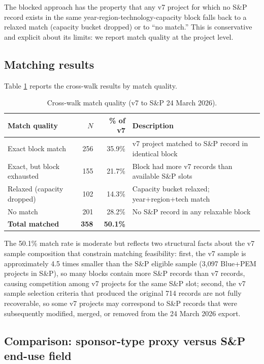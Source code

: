 \documentclass[11pt,a4paper]{article}
\begin{document}
The blocked approach has the property that any v7 project for which no S\&P record exists in the same year-region-technology-capacity block falls back to a relaxed match (capacity bucket dropped) or to ``no match.'' This is conservative and explicit about its limits: we report match quality at the project level.

\subsection{Matching results}

Table \ref{tab:app-matching-quality} reports the cross-walk results by match quality.

\begin{table}[ht]
\centering
\caption{Cross-walk match quality (v7 to S\&P 24 March 2026).}
\label{tab:app-matching-quality}
\begin{tabular}{lrrl}
\toprule
Match quality & $N$ & \% of v7 & Description \\
\midrule
Exact block match           & 256 & 35.9\% & v7 project matched to S\&P record in identical block \\
Exact, but block exhausted  & 155 & 21.7\% & Block had more v7 records than available S\&P slots \\
Relaxed (capacity dropped)  & 102 & 14.3\% & Capacity bucket relaxed; year+region+tech match \\
No match                    & 201 & 28.2\% & No S\&P record in any relaxable block \\
\midrule
\textbf{Total matched}      & \textbf{358} & \textbf{50.1\%} & \\
\bottomrule
\end{tabular}
\end{table}

The 50.1\% match rate is moderate but reflects two structural facts about the v7 sample composition that constrain matching feasibility: first, the v7 sample is approximately 4.5 times smaller than the S\&P eligible sample (3{,}097 Blue+PEM projects in S\&P), so many blocks contain more S\&P records than v7 records, causing competition among v7 projects for the same S\&P slot; second, the v7 sample selection criteria that produced the original 714 records are not fully recoverable, so some v7 projects may correspond to S\&P records that were subsequently modified, merged, or removed from the 24 March 2026 export.

\subsection{Comparison: sponsor-type proxy versus S\&P end-use field}
\end{document}
